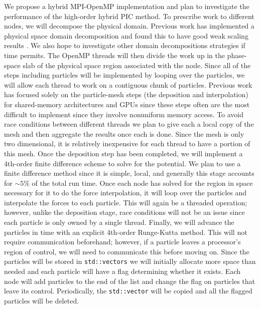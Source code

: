 \documentclass[aps,12pt, notitlepage]{revtex4-1}
\renewcommand{\=}[1]{\overline{#1}}
\begin{document}
We propose a hybrid MPI-OpenMP implementation and plan to investigate the performance of the high-order hybrid PIC method. 
To prescribe work to different nodes, we will decompose the physical domain. Previous work has implemented a physical space domain decomposition and found this to have good weak scaling results \cite{wang2011particle}.
We also hope to investigate other domain decompositions strategies if time permits. 
The OpenMP threads will then divide the work up in the phase-space slab of the physical space region associated with the node.
Since all of the steps including particles will be implemented by looping over the particles, we will allow each thread to work on a contiguous chunk of particles.  
Previous work has focused solely on the particle-mesh steps (the deposition and interpolation) for shared-memory architectures \cite{madduri2012optimization} and GPUs \cite{stantchev2008fast, buyukkecceci2013portable} since these steps often are the most difficult to implement since they involve nonuniform memory access. 
To avoid race conditions between different threads we plan to give each a local copy of the mesh and then aggregate the results once each is done. 
Since the mesh is only two dimensional, it is relatively inexpensive for each thread to have a portion of this mesh. 
Once the deposition step has been completed, we will implement a 4th-order finite difference scheme to solve for the potential.
We plan to use a finite difference method since it is simple, local, and generally this stage accounts for $\sim 5\%$ of the total run time. 
Once each node has solved for the region in space necessary for it to do the force interpolation, it will loop over the particles and interpolate the forces to each particle.
This will again be a threaded operation; however, unlike the deposition stage, race conditions will not be an issue since each particle is only owned by a single thread. 
Finally, we will advance the particles in time with an explicit 4th-order Runge-Kutta method.
This will not require communication beforehand; however, if a particle leaves a processor's region of control, we will need to communicate this before moving on. 
Since the particles will be stored in \texttt{std::vectors} we will initially allocate more space than needed and each particle will have a flag determining whether it exists. 
Each node will add particles to the end of the list and change the flag on particles that leave its control.  
Periodically, the \texttt{std::vector} will be copied and all the flagged particles will be deleted. 
\end{document}
